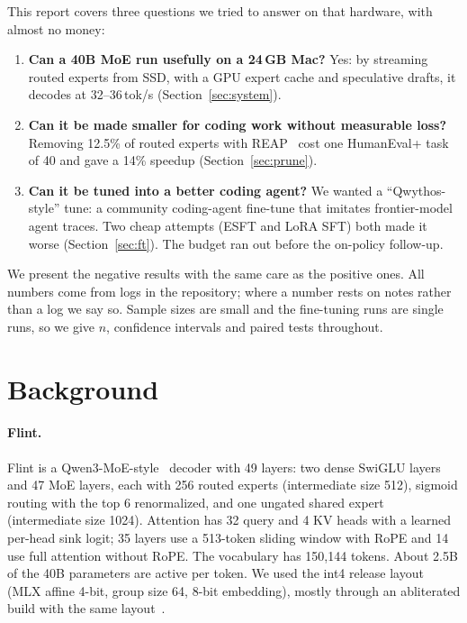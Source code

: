 \documentclass[11pt]{article}
\newcommand{\tps}{tok/s}
\begin{document}
This report covers three questions we tried to answer on that hardware, with almost no money:

\begin{enumerate}
  \item \textbf{Can a 40B MoE run usefully on a 24\,GB Mac?} Yes: by streaming routed experts from SSD, with a GPU
        expert cache and speculative drafts, it decodes at 32--36\,\tps{} (Section~\ref{sec:system}).
  \item \textbf{Can it be made smaller for coding work without measurable loss?} Removing 12.5\% of routed experts with
        REAP~\citep{lasby2025reap} cost one HumanEval+ task of 40 and gave a 14\% speedup (Section~\ref{sec:prune}).
  \item \textbf{Can it be tuned into a better coding agent?} We wanted a ``Qwythos-style'' tune: a community coding-agent
        fine-tune that imitates frontier-model agent traces. Two cheap attempts (ESFT and LoRA SFT) both made it worse
        (Section~\ref{sec:ft}). The budget ran out before the on-policy follow-up.
\end{enumerate}

We present the negative results with the same care as the positive ones. All numbers come from logs in the repository;
where a number rests on notes rather than a log we say so. Sample sizes are small and the fine-tuning runs are single
runs, so we give $n$, confidence intervals and paired tests throughout.

\section{Background}

\paragraph{Flint.} Flint is a Qwen3-MoE-style~\citep{qwen3} decoder with 49 layers: two dense SwiGLU layers and 47 MoE
layers, each with 256 routed experts (intermediate size 512), sigmoid routing with the top 6 renormalized, and one
ungated shared expert (intermediate size 1024). Attention has 32 query and 4 KV heads with a learned per-head sink logit;
35 layers use a 513-token sliding window with RoPE and 14 use full attention without RoPE. The vocabulary has 150,144
tokens. About 2.5B of the 40B parameters are active per token. We used the int4 release layout (MLX affine 4-bit, group
size 64, 8-bit embedding), mostly through an abliterated build with the same layout~\citep{abliterated}.
\end{document}
